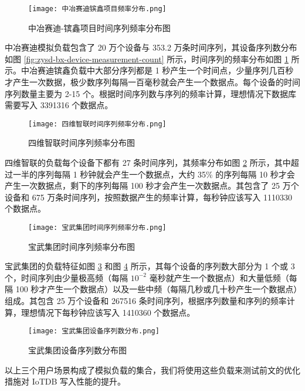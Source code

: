 \begin{figure}
  \centering
  \texttt{[image: 中冶赛迪镔鑫项目频率分布.png]}
  \caption{中冶赛迪-镔鑫项目时间序列频率分布图}
  \label{fig:zysd-bx-freq-distribution}
\end{figure}

中冶赛迪模拟负载包含了 20 万个设备与 353.2 万条时间序列，其设备序列数分布如图 \ref{fig:zysd-bx-device-measurement-count} 所示，时间序列的频率分布如图 \ref{fig:zysd-bx-freq-distribution} 所示。中冶赛迪镔鑫负载中大部分序列都是 1 秒产生一个时间点，少量序列几百秒才产生一次数据，极少数序列每隔一百毫秒就会产生一个数据点。每个设备的时间序列数量主要为 2-15 个。根据时间序列数与序列的频率计算，理想情况下数据库需要写入 3391316 个数据点。
\begin{figure}
  \centering
  \texttt{[image: 四维智联时间序列频率分布.png]}
  \caption{四维智联时间序列频率分布图}
  \label{fig:swzl-freq-distribution}
\end{figure}

四维智联的负载每个设备下都有 27 条时间序列，其频率分布如图 \ref{fig:swzl-freq-distribution} 所示，其中超过一半的序列每隔 1 秒钟就会产生一个数据点，大约 35\% 的序列每隔 10 秒才会产生一次数据点，剩下的序列每隔 100 秒才会产生一次数据点。其包含了 25 万个设备和 675 万条时间序列，按照数据产生的频率计算，每秒钟应该写入 1110330 个数据点。

\begin{figure}
  \centering
  \texttt{[image: 宝武集团时间序列频率分布.png]}
  \caption{宝武集团时间序列频率分布图}
  \label{fig:bw-freq-distribution}
\end{figure}

宝武集团的负载特征如图 \ref{fig:bw-freq-distribution} 和图 \ref{fig:bw-device-measurement-count} 所示，其每个设备的序列数大部分为 1 个或 3 个，时间序列由少量极高频（每隔 $10^{-2}$ 毫秒就产生一个数据点）和大量低频（每隔 100 秒才产生一个数据点）以及一些中频（每隔几秒或几十秒产生一个数据点）组成。其包含 25 万个设备和 267516 条时间序列，根据序列数量和序列的频率计算，理想情况下每秒钟应该写入 1410360 个数据点。

\begin{figure}
  \centering
  \texttt{[image: 宝武集团设备序列数分布.png]}
  \caption{宝武集团设备序列数分布图}
  \label{fig:bw-device-measurement-count}
\end{figure}

以上三个用户场景构成了模拟负载的集合，我们将使用这些负载来测试前文的优化措施对 IoTDB 写入性能的提升。 

